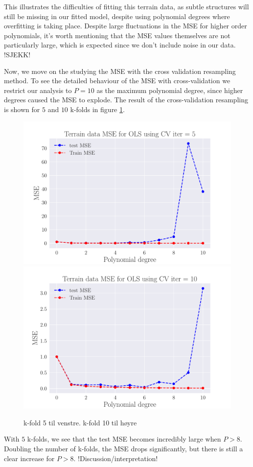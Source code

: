 \documentclass[reprint,english,notitlepage,aps,nobalancelastpage,nofootinbib]{revtex4-1}  %
\begin{document}
This illustrates the difficulties of fitting this terrain data, as subtle structures will still be missing in our fitted model, despite using polynomial degrees where overfitting is taking place. Despite large fluctuations in the MSE for higher order polynomials, it's worth mentioning that the MSE values themselves are not particularly large, which is expected since we don't include noise in our data. !SJEKK!

Now, we move on the studying the MSE with the cross validation resampling method. To see the detailed behaviour of the MSE with cross-validation we restrict our analysis to $P=10$ as the maximum polynomial degree, since higher degrees caused the MSE to explode. The result of the cross-validation resampling is shown for $5$ and $10$ k-folds in figure \ref{fig:terrain_OLS_MSE_CV}.
\begin{figure}[H]
	\includegraphics[width=\linewidth]{SRTM_MSE_OLS_n50_pol10_CV_re5.pdf}
	\endminipage\hfill
	\includegraphics[width=\linewidth]{SRTM_MSE_OLS_n50_pol10_CV_re10.pdf}
	\endminipage
	\caption{k-fold 5 til venstre. k-fold 10 til høyre}
  \label{fig:terrain_OLS_MSE_CV}
\end{figure}
With $5$ k-folds, we see that the test MSE becomes incredibly large when $P>8$. Doubling the number of k-folds, the MSE drops significantly, but there is still a clear increase for $P>8$.
!Discussion/interpretation!
\end{document}
